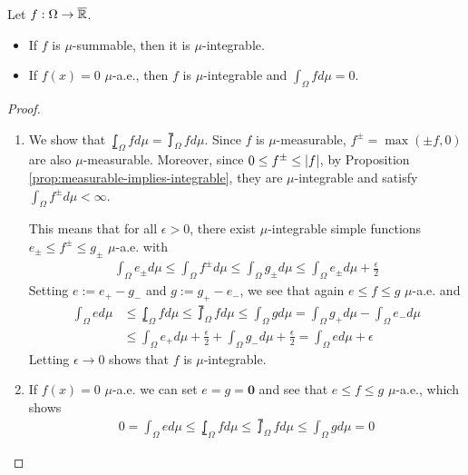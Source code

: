 \begin{prop}
Let $f: \Omega \to \overline{\mathbb{R}}$.
\begin{itemize}
  \item If $f$ is $\mu$-summable, then it is $\mu$-integrable.
  \item If $f(x) = 0$ $\mu$-a.e., then $f$ is $\mu$-integrable and $\int_{\Omega} f d \mu = 0$.
\end{itemize}
\end{prop}
\begin{proof}
  \phantom{a}
  \begin{enumerate}
    \item We show that $\lowint_{\Omega}f d \mu = \upint_{\Omega} f d \mu$.
      Since $f$ is $\mu$-measurable, $f^{\pm} = \max(\pm f,0)$ are also $\mu$-measurable. Moreover, since $0 \leq f^{\pm} \leq \vert f\vert$, by Proposition \ref{prop:measurable-implies-integrable}, they are $\mu$-integrable and satisfy $\int_{\Omega} f^{\pm} d \mu < \infty$.

  This means that for all $\epsilon > 0$, there exist $\mu$-integrable simple functions $e_{\pm} \leq f^{\pm} \leq g_{\pm}$ $\mu$-a.e. with
  \begin{align*}
    \int_{\Omega} e_{\pm} d \mu \leq \int_{\Omega}f^{\pm} d \mu \leq \int_{\Omega} g_{\pm} d \mu \leq \int_{\Omega} e_{\pm}  d \mu + \frac{\epsilon}{2}
  \end{align*}
  Setting $e := e_+ - g_-$ and $g := g_+ - e_-$, we see that again $e \leq f \leq g$ $\mu$-a.e. and
  \begin{align*}
    \int_{\Omega} e d \mu 
    &\leq 
    \lowint_{\Omega}f d \mu 
    \leq 
    \upint_{\Omega} f d \mu 
    \leq 
    \int_{\Omega} g d \mu 
    = 
    \int_{\Omega} g_+ d \mu- \int_{\Omega}e_- d \mu
    \\
    &\leq
    \int_{\Omega} e_+ d \mu + \frac{\epsilon}{2}+ \int_{\Omega} g_- d \mu + \frac{\epsilon}{2}
    = 
    \int_{\Omega} e d \mu + \epsilon
  \end{align*}
  Letting $\epsilon \to 0$ shows that $f$ is $\mu$-integrable.

  \item If $f(x) = 0$ $\mu$-a.e. we can set $e = g = \bm{0}$ and see that $e \leq f \leq g$ $\mu$-a.e., which shows
    \begin{align*}
      0 = \int_{\Omega}e d \mu \leq \lowint_{\Omega}f d \mu \leq \upint_{\Omega}f d \mu \leq \int_{\Omega} g d \mu = 0
    \end{align*}

  \end{enumerate}
\end{proof}

